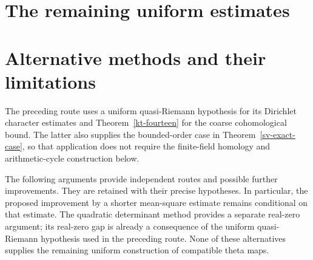 \part{The remaining uniform estimates}


\appendix
\part{Alternative methods and their limitations}

The preceding route uses a uniform quasi-Riemann hypothesis for its
Dirichlet character estimates and Theorem~\ref{kt-fourteen} for the coarse
cohomological bound.  The latter also supplies the bounded-order case in
Theorem~\ref{sv-exact-case}, so that application does not require the
finite-field homology and arithmetic-cycle construction below.

The following arguments provide independent routes and possible further
improvements.  They are retained with their precise hypotheses.  In
particular, the proposed improvement by a shorter mean-square estimate
remains conditional on that estimate.  The quadratic determinant method
provides a separate real-zero argument; its real-zero gap is already a
consequence of the uniform quasi-Riemann hypothesis used in the preceding
route.  None of these alternatives supplies the remaining uniform
construction of compatible theta maps.
















\clearpage



